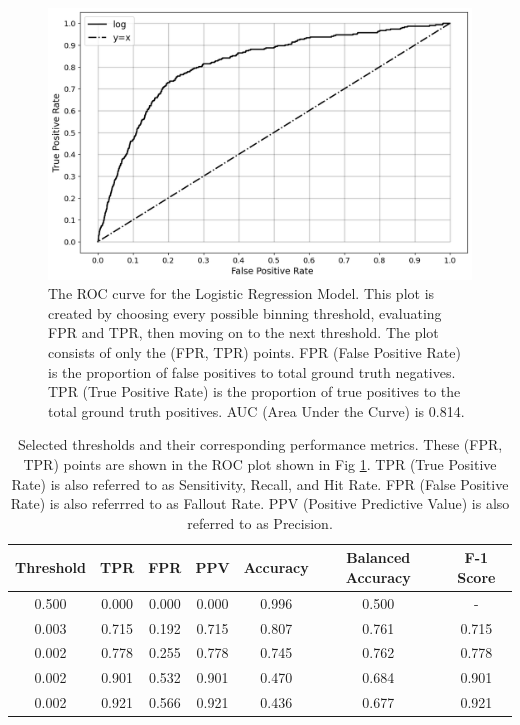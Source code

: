 \documentclass[10pt,letterpaper]{article}
\newcommand{\red}[1]{{\color{red}{#1}}}
\begin{document}
\begin{figure}[htb]
    \centering
    \includegraphics[width=\textwidth]{../img/ROC.png}
    \caption[ROC curve]{The ROC curve for the Logistic Regression Model. This plot is created by choosing every possible binning threshold, evaluating FPR and TPR, then moving on to the next threshold. The plot consists of only the (FPR, TPR) points. FPR (False Positive Rate) is the proportion of false positives to total ground truth negatives. TPR (True Positive Rate) is the proportion of true positives to the total ground truth positives. AUC (Area Under the Curve) is 0.814.}
    \label{fig:ROC}
\end{figure}
\red{REMOVE GRAPHICS BEFORE SUBMISSION}

\begin{table}[htb]
    \centering
    \begin{tabular}{ccccccc}
        \toprule
        Threshold &   TPR &   FPR & PPV & Accuracy &  Balanced Accuracy & F-1 Score \\
        \midrule
        0.500 & 0.000 & 0.000 & 0.000 &     0.996 &     0.500 &   - \\
        0.003 & 0.715 & 0.192 & 0.715 &     0.807 &     0.761 & 0.715 \\
        0.002 & 0.778 & 0.255 & 0.778 &     0.745 &     0.762 & 0.778 \\
        0.002 & 0.901 & 0.532 & 0.901 &     0.470 &     0.684 & 0.901 \\
        0.002 & 0.921 & 0.566 & 0.921 &     0.436 &     0.677 & 0.921 \\
        \bottomrule
    \end{tabular}
    \caption{Selected thresholds and their corresponding performance metrics. These (FPR, TPR) points are shown in the ROC plot shown in Fig \ref{fig:ROC}. TPR (True Positive Rate) is also referred to as Sensitivity, Recall, and Hit Rate. FPR (False Positive Rate) is also referrred to as Fallout Rate. PPV (Positive Predictive Value) is also referred to as Precision.}
    \label{tbl:performance}
\end{table}
\end{document}

